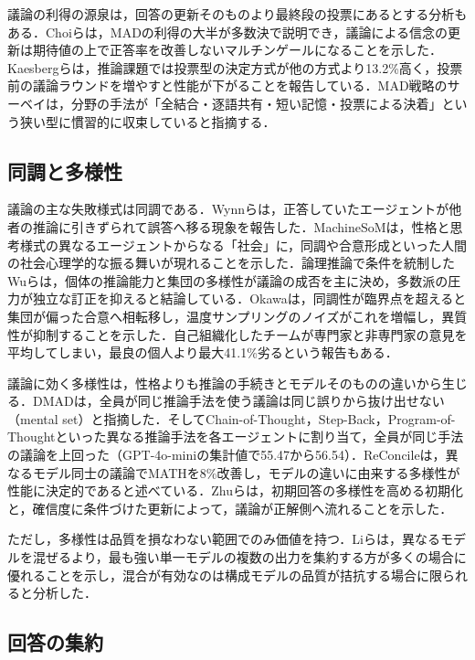 議論の利得の源泉は，回答の更新そのものより最終段の投票にあるとする分析もある．Choiら\cite{choi2025debate}は，MADの利得の大半が多数決で説明でき，議論による信念の更新は期待値の上で正答率を改善しないマルチンゲールになることを示した．Kaesbergら\cite{kaesberg2025voting}は，推論課題では投票型の決定方式が他の方式より13.2\%高く，投票前の議論ラウンドを増やすと性能が下がることを報告している．MAD戦略のサーベイ\cite{motger2026madsurvey}は，分野の手法が「全結合・逐語共有・短い記憶・投票による決着」という狭い型に慣習的に収束していると指摘する．

\subsection{同調と多様性}
\label{sec:2.1.2}

議論の主な失敗様式は同調である．Wynnら\cite{talk2025cheap}は，正答していたエージェントが他者の推論に引きずられて誤答へ移る現象を報告した．MachineSoM\cite{zhang2024machinesom}は，性格と思考様式の異なるエージェントからなる「社会」に，同調や合意形成といった人間の社会心理学的な振る舞いが現れることを示した．論理推論で条件を統制したWuら\cite{wu2025debate}は，個体の推論能力と集団の多様性が議論の成否を主に決め，多数派の圧力が独立な訂正を抑えると結論している．Okawa\cite{okawa2026biased}は，同調性が臨界点を超えると集団が偏った合意へ相転移し，温度サンプリングのノイズがこれを増幅し，異質性が抑制することを示した．自己組織化したチームが専門家と非専門家の意見を平均してしまい，最良の個人より最大41.1\%劣るという報告もある\cite{pappu2026experts}．

議論に効く多様性は，性格よりも推論の手続きとモデルそのものの違いから生じる．DMAD\cite{liu2025dmad}は，全員が同じ推論手法を使う議論は同じ誤りから抜け出せない（mental set）と指摘した．そしてChain-of-Thought，Step-Back，Program-of-Thoughtといった異なる推論手法を各エージェントに割り当て，全員が同じ手法の議論を上回った（GPT-4o-miniの集計値で55.47から56.54）．ReConcile\cite{chen2024reconcile}は，異なるモデル同士の議論でMATHを8\%改善し，モデルの違いに由来する多様性が性能に決定的であると述べている．Zhuら\cite{demystifying2026mad}は，初期回答の多様性を高める初期化と，確信度に条件づけた更新によって，議論が正解側へ流れることを示した．

ただし，多様性は品質を損なわない範囲でのみ価値を持つ．Liら\cite{li2025rethinking}は，異なるモデルを混ぜるより，最も強い単一モデルの複数の出力を集約する方が多くの場合に優れることを示し，混合が有効なのは構成モデルの品質が拮抗する場合に限られると分析した．

\subsection{回答の集約}
\label{sec:2.1.3}

